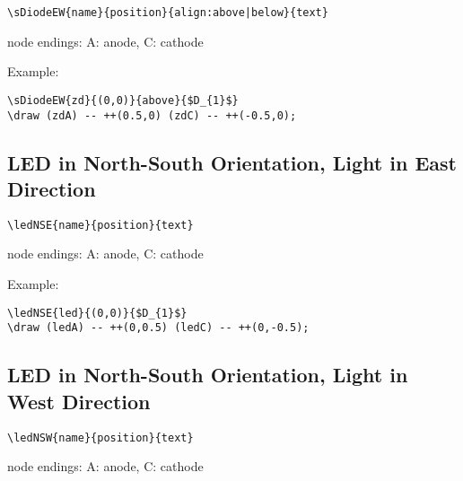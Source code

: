 \documentclass[parskip=full]{scrartcl}
\begin{document}
\begin{verbatim}
\sDiodeEW{name}{position}{align:above|below}{text}
\end{verbatim}
node endings: A: anode, C: cathode

Example:\\
\begin{minipage}{0.8\textwidth}
\begin{verbatim}
\sDiodeEW{zd}{(0,0)}{above}{$D_{1}$}
\draw (zdA) -- ++(0.5,0) (zdC) -- ++(-0.5,0);
\end{verbatim}
\end{minipage}
\begin{minipage}{0.19\textwidth}
\end{minipage}

\subsection{LED in North-South Orientation, Light in East Direction}

\begin{verbatim}
\ledNSE{name}{position}{text}
\end{verbatim}
node endings: A: anode, C: cathode

Example:\\
\begin{minipage}{0.8\textwidth}
\begin{verbatim}
\ledNSE{led}{(0,0)}{$D_{1}$}
\draw (ledA) -- ++(0,0.5) (ledC) -- ++(0,-0.5);
\end{verbatim}
\end{minipage}
\begin{minipage}{0.19\textwidth}
\end{minipage}

\subsection{LED in North-South Orientation, Light in West Direction}

\begin{verbatim}
\ledNSW{name}{position}{text}
\end{verbatim}
node endings: A: anode, C: cathode
\end{document}
